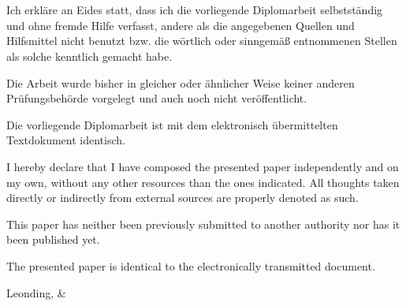 \thispagestyle{empty}
\vspace{3cm}
~ \\ \\
{
Ich erkläre an Eides statt, dass ich die vorliegende Diplomarbeit selbstständig und ohne fremde Hilfe verfasst, andere als die angegebenen Quellen und Hilfsmittel nicht benutzt bzw. die wörtlich oder sinngemäß entnommenen Stellen als solche kenntlich gemacht habe.

Die Arbeit wurde bisher in gleicher oder ähnlicher Weise keiner anderen Prüfungsbehörde vorgelegt und auch noch nicht veröffentlicht.

Die vorliegende Diplomarbeit ist mit dem elektronisch übermittelten Textdokument identisch.
}
{
I hereby declare that I have composed the presented paper independently and on my own, without any other resources than the ones indicated. 
All thoughts taken directly or indirectly from external sources are properly denoted as such.

This paper has neither been previously submitted to another authority nor has it been published yet.

The presented paper is identical to the electronically transmitted document.
}
\vspace{3cm}
\begin{tabbing}
Leonding,  \hspace{4cm} {\firstauthor} \& \\\hspace{8.5cm}{\secondauthor} %
\end{tabbing}
\vspace{10cm}
\newpage
\setcounter{page}{1}
